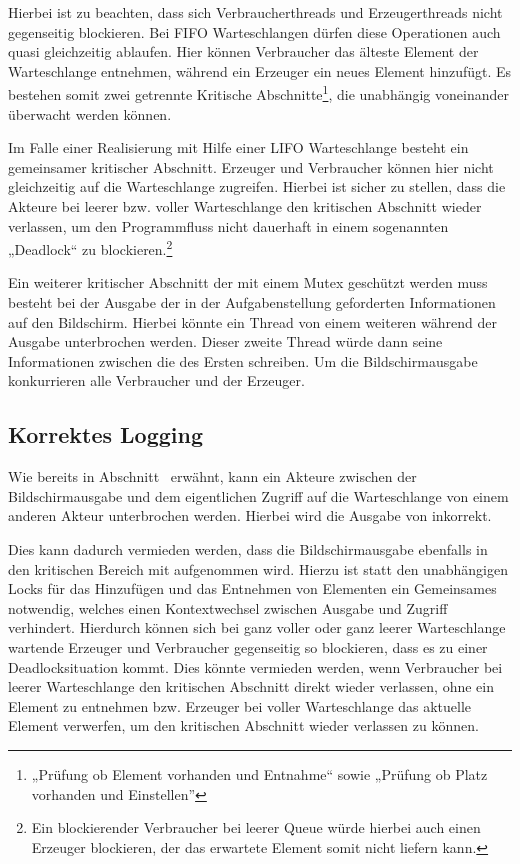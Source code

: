 Hierbei ist zu beachten, dass sich Verbraucherthreads und Erzeugerthreads nicht gegenseitig blockieren. Bei \ac{FIFO} Warteschlangen dürfen diese Operationen auch quasi gleichzeitig ablaufen. Hier können Verbraucher das älteste Element der Warteschlange entnehmen, während ein Erzeuger ein neues Element hinzufügt. Es bestehen somit zwei getrennte Kritische Abschnitte\footnote{„Prüfung ob Element vorhanden und Entnahme“ sowie „Prüfung ob Platz vorhanden und Einstellen”}, die unabhängig voneinander überwacht werden können.

Im Falle einer Realisierung mit Hilfe einer \ac{LIFO} Warteschlange besteht ein gemeinsamer kritischer Abschnitt. Erzeuger und Verbraucher können hier nicht gleichzeitig auf die Warteschlange zugreifen. Hierbei ist sicher zu stellen, dass die Akteure bei leerer bzw. voller Warteschlange den kritischen Abschnitt wieder verlassen, um den Programmfluss nicht dauerhaft in einem sogenannten „Deadlock“ zu blockieren.\footnote{Ein blockierender Verbraucher bei leerer Queue würde hierbei auch einen Erzeuger blockieren, der das erwartete Element somit nicht liefern kann.}

Ein weiterer kritischer Abschnitt der mit einem Mutex geschützt werden muss besteht bei der Ausgabe der in der Aufgabenstellung geforderten Informationen auf den Bildschirm. Hierbei könnte ein Thread von einem weiteren während der Ausgabe unterbrochen werden. Dieser zweite Thread würde dann seine Informationen zwischen die des Ersten schreiben. Um die Bildschirmausgabe konkurrieren alle Verbraucher und der Erzeuger.

\subsection{Korrektes Logging} %
\label{sub:korrektes_logging}
Wie bereits in Abschnitt~ erwähnt, kann ein Akteure  zwischen der Bildschirmausgabe und dem eigentlichen Zugriff auf die Warteschlange von einem anderen Akteur  unterbrochen werden. Hierbei wird die Ausgabe von  inkorrekt.

Dies kann dadurch vermieden werden, dass die Bildschirmausgabe ebenfalls in den kritischen Bereich mit aufgenommen wird. Hierzu ist statt den unabhängigen Locks für das Hinzufügen und das Entnehmen von Elementen ein Gemeinsames notwendig, welches einen Kontextwechsel zwischen Ausgabe und Zugriff verhindert. Hierdurch können sich bei ganz voller oder ganz leerer Warteschlange wartende Erzeuger und Verbraucher gegenseitig so blockieren, dass es zu einer Deadlocksituation kommt. Dies könnte vermieden werden, wenn Verbraucher bei leerer Warteschlange den kritischen Abschnitt direkt wieder verlassen, ohne ein Element zu entnehmen bzw. Erzeuger bei voller Warteschlange das aktuelle Element verwerfen, um den kritischen Abschnitt wieder verlassen zu können.

